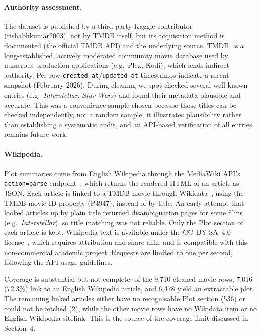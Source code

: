 \documentclass[sigconf]{acmart}
\begin{document}
\paragraph{Authority assessment.} The dataset is published by a third-party Kaggle
contributor (rishabhkumar2003), not by TMDB itself, but its acquisition method is
documented (the official TMDB API) and the underlying source, TMDB, is a
long-established, actively moderated community movie database used by numerous
production applications (e.g.\ Plex, Kodi), which lends indirect authority. Per-row
\texttt{created\_at}/\texttt{updated\_at} timestamps indicate a recent snapshot
(February 2026). During cleaning we spot-checked several well-known entries (e.g.\
\textit{Interstellar}, \textit{Star Wars}) and found their metadata plausible and
accurate. This was a convenience sample chosen because those titles can be checked
independently, not a random sample; it illustrates plausibility rather than
establishing a systematic audit, and an API-based verification of all entries remains
future work.

\paragraph{Wikipedia.}
Plot summaries come from English Wikipedia through the MediaWiki API's
\texttt{action=parse} endpoint~\cite{wikipedia,mediawiki-api}, which returns the
rendered HTML of an article as JSON. Each article is linked to a TMDB movie through
Wikidata~\cite{wikidata}, using the TMDB movie ID property (P4947), instead of by
title. An early attempt that looked articles up by plain title returned
disambiguation pages for some films (e.g.\ \textit{Interstellar}), so title matching
was not reliable. Only the Plot section of each article is kept. Wikipedia text is
available under the CC~BY-SA~4.0 license~\cite{wikimedia-terms}, which requires
attribution and share-alike and is compatible with this non-commercial academic
project. Requests are limited to one per second, following the API usage guidelines.

Coverage is substantial but not complete: of the 9{,}710 cleaned movie rows, 7{,}016
(72.3\%) link to an English Wikipedia article, and 6{,}478 yield an extractable plot.
The remaining linked articles either have no recognisable Plot section (536) or could
not be fetched (2), while the other movie rows have no Wikidata item or no English
Wikipedia sitelink. This is the source of the coverage limit discussed in
Section~4.
\end{document}
